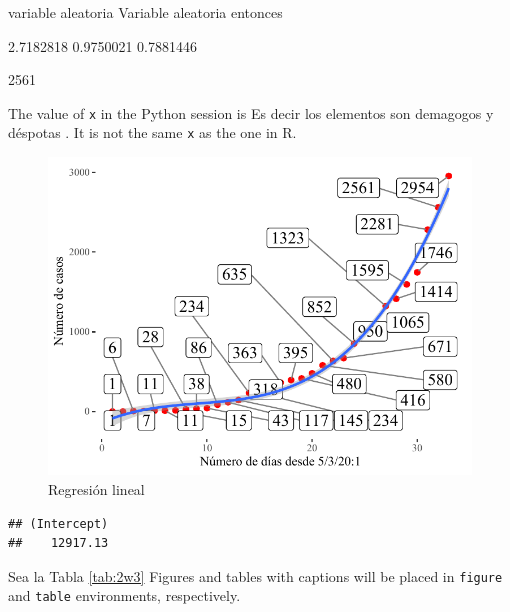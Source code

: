 \documentclass[
  10pt,
]{krantz}
\let\oldincludegraphics\includegraphics
\renewcommand\includegraphics[2][]{%
  \oldincludegraphics[scale=0.85]{#2}
}
\theoremstyle{definition}
\theoremstyle{definition}
\theoremstyle{definition}
\theoremstyle{definition}
\theoremstyle{remark}
\begin{document}
variable aleatoria Variable aleatoria entonces

2.7182818 0.9750021 0.7881446

2561

The value of \texttt{x} in the Python session is Es decir los elementos son demagogos y déspotas .
It is not the same \texttt{x} as the one in R.

\begin{figure}

{\centering \includegraphics{E_1_files/figure-latex/ww1w-1} 

}

\caption{Regresión lineal}\label{fig:ww1w}
\end{figure}

\begin{verbatim}
## (Intercept) 
##    12917.13
\end{verbatim}

Sea la Tabla \ref{tab:2w3} Figures and tables with captions will be placed in \texttt{figure} and \texttt{table} environments, respectively.
\end{document}
